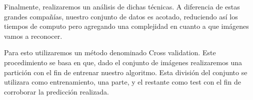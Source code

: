 Finalmente, realizaremos un análisis de dichas técnicas. A diferencia de estas grandes compañías, nuestro conjunto de datos es acotado, reduciendo así los tiempos de computo pero agregando una complejidad en cuanto a que imágenes vamos a reconocer. 

Para esto utilizaremos un método denominado Cross validation. Este procedimiento se basa en que, dado el conjunto de imágenes realizaremos una partición con el fin de entrenar nuestro algoritmo. Esta división del conjunto se utilizara como entrenamiento, una parte, y el restante como test con el fin de corroborar la predicción realizada.
